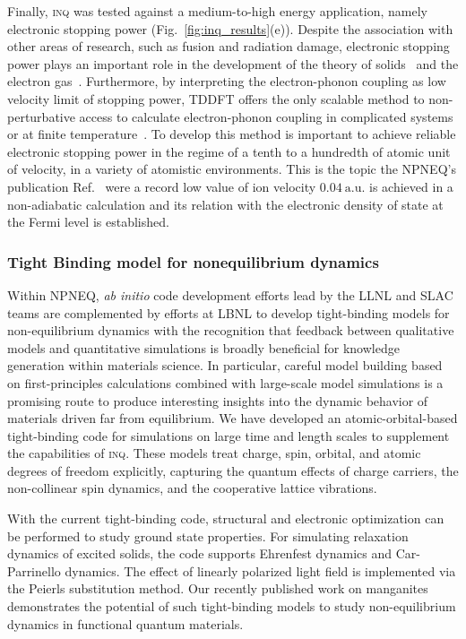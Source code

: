 Finally, \textsc{inq} was tested against a medium-to-high energy application, namely electronic stopping power (Fig.~\ref{fig:inq_results}(e)). 
Despite the association with other areas of research, such as fusion and radiation damage, electronic stopping power plays an important role in the development of the theory of solids~\cite{Thomson1912, Darwin1912, Bohr1913} and the electron gas~\cite{Lindhard1964}.
Furthermore, by interpreting the electron-phonon coupling as low velocity limit of stopping power, TDDFT offers the only scalable method to non-perturbative access to calculate electron-phonon coupling in complicated systems or at finite temperature~\cite{Caro2015}. 
To develop this method is important to achieve reliable electronic stopping power in the regime of a tenth to a hundredth of atomic unit of velocity, in a variety of atomistic environments. 
This is the topic the NPNEQ's publication Ref.~\cite{Quashie2020} were a record low value of ion velocity \(0.04~\mathrm{a.u.}\) is achieved in a non-adiabatic calculation and its relation with the electronic density of state at the Fermi level is established.

\subsubsection{Tight Binding model for nonequilibrium dynamics}\label{sec:tight-binding}

Within NPNEQ, \emph{ab initio} code development efforts lead by the LLNL and SLAC teams are complemented by efforts at LBNL to develop tight-binding models for non-equilibrium dynamics with the recognition that feedback between qualitative models and quantitative simulations is broadly beneficial for knowledge generation within materials science. 
In particular, careful model building based on first-principles calculations combined with large-scale model simulations is a promising route to produce interesting insights into the dynamic behavior of  materials driven far from equilibrium. 
We have developed an atomic-orbital-based tight-binding code for simulations on large time and length scales to supplement the capabilities of \textsc{inq}. 
These models treat charge, spin, orbital, and atomic degrees of freedom explicitly, capturing the quantum effects of charge carriers, the non-collinear spin dynamics, and the cooperative lattice vibrations. 

With the current tight-binding code, structural and electronic optimization can be performed to study ground state properties. 
For simulating relaxation dynamics of excited solids, the code supports Ehrenfest dynamics and Car-Parrinello dynamics. 
The effect of linearly polarized light field is implemented via the Peierls substitution method. 
Our recently published work on manganites~\cite{Rajpurohit2021} demonstrates the potential of such tight-binding models to study non-equilibrium dynamics in functional quantum materials. 

